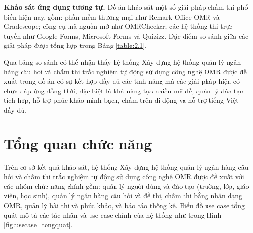﻿\documentclass[../DoAn.tex]{subfiles}
\begin{document}
\noindent\textbf{Khảo sát ứng dụng tương tự.} Đồ án khảo sát một số giải pháp chấm thi phổ biến hiện nay, gồm: phần mềm thương mại như Remark Office OMR và Gradescope; công cụ mã nguồn mở như OMRChecker; các hệ thống thi trực tuyến như Google Forms, Microsoft Forms và Quizizz. Đặc điểm so sánh giữa các giải pháp được tổng hợp trong Bảng \ref{table:2.1}.
\begin{table}[H]
\centering
{}
\caption{So sánh tính năng giữa các giải pháp chấm thi hiện có}
\label{table:2.1}
\end{table}
Qua bảng so sánh có thể nhận thấy hệ thống Xây dựng hệ thống quản lý ngân hàng câu hỏi và chấm thi trắc nghiệm tự động sử dụng công nghệ OMR được đề xuất trong đồ án có sự kết hợp đầy đủ các tính năng mà các giải pháp hiện có chưa đáp ứng đồng thời, đặc biệt là khả năng tạo nhiều mã đề, quản lý đào tạo tích hợp, hỗ trợ phúc khảo minh bạch, chấm trên di động và hỗ trợ tiếng Việt đầy đủ.

\section{Tổng quan chức năng}
\label{section:2.2}

Trên cơ sở kết quả khảo sát, hệ thống Xây dựng hệ thống quản lý ngân hàng câu hỏi và chấm thi trắc nghiệm tự động sử dụng công nghệ OMR được đề xuất với các nhóm chức năng chính gồm: quản lý người dùng và đào tạo (trường, lớp, giáo viên, học sinh), quản lý ngân hàng câu hỏi và đề thi, chấm thi bằng nhận dạng OMR, quản lý bài thi và phúc khảo, và báo cáo thống kê. Biểu đồ use case tổng quát mô tả các tác nhân và use case chính của hệ thống như trong Hình \ref{fig:usecase_tongquat}.
\end{document}
